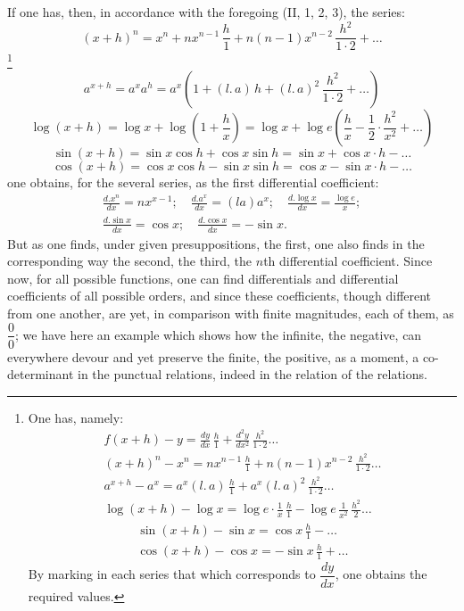 \documentclass[12pt]{book}
\begin{document}
If one has, then, in accordance with the foregoing (II, 1, 2, 3), the series:
\[
(x + h)^{n} = x^{n} + nx^{n-1}\,\frac{h}{1} + n(n - 1)x^{n-2}\,\frac{h^{2}}{1\cdot2}
+ \dots
\]\footnote{One has, namely:
\begin{gather*}
f(x + h) - y = \frac{dy}{dx}\,\frac{h}{1} + \frac{d^{2}y}{dx^{2}}\,
\frac{h^{2}}{1\cdot2} \dots\\
(x + h)^{n} - x^{n} = nx^{n-1}\,\frac{h}{1} + n(n - 1)x^{n-2}\,
\frac{h^{2}}{1\cdot2} \dots\\
a^{x+h} - a^{x} = a^{x}(l.\,a)\,\frac{h}{1} + a^{x}(l.\,a)^{2}\,
\frac{h^{2}}{1\cdot2} \dots\\
\log(x + h) - \log x = \log e\cdot\frac{1}{x}\,\frac{h}{1}
- \log e\,\frac{1}{x^{2}}\,\frac{h^{2}}{2} \dots
\end{gather*}
\begin{gather*}
\sin(x + h) - \sin x = \cos x\,\frac{h}{1} - \dots\\
\cos(x + h) - \cos x = -\sin x\,\frac{h}{1} + \dots
\end{gather*}
By marking in each series that which corresponds to $\dfrac{dy}{dx}$, one obtains the
required values.}
\[
a^{x+h} = a^{x}a^{h} = a^{x}\left(1 + (l.\,a)\,h + (l.\,a)^{2}\,\frac{h^{2}}{1\cdot2}
+ \dots\right)
\]
\[
\log(x + h) = \log x + \log\left(1 + \frac{h}{x}\right)
= \log x + \log e\left(\frac{h}{x} - \frac{1}{2}\cdot\frac{h^{2}}{x^{2}} + \dots\right)
\]
\[
\sin(x + h) = \sin x\cos h + \cos x\sin h = \sin x + \cos x\cdot h - \dots
\]
\[
\cos(x + h) = \cos x\cos h - \sin x\sin h = \cos x - \sin x\cdot h - \dots
\]
one obtains, for the several series, as the first differential coefficient:
\begin{gather*}
\frac{d.x^{n}}{dx} = nx^{x-1};\quad \frac{d.a^{x}}{dx} = (la)a^{x};\quad
\frac{d.\log x}{dx} = \frac{\log e}{x};\\
\frac{d.\sin x}{dx} = \cos x;\quad \frac{d.\cos x}{dx} = -\sin x.
\end{gather*}
But as one finds, under given presuppositions, the first, one also finds in the
corresponding way the second, the third, the $n$th differential coefficient. Since
now, for all possible functions, one can find differentials and differential
coefficients of all possible orders, and since these coefficients, though different
from one another, are yet, in comparison with finite magnitudes, each of them, as
$\dfrac{0}{0}$; we have here an example which shows how the infinite, the negative,
can everywhere devour and yet preserve the finite, the positive, as a moment, a
co-determinant in the punctual relations, indeed in the relation of the relations.
\end{document}

